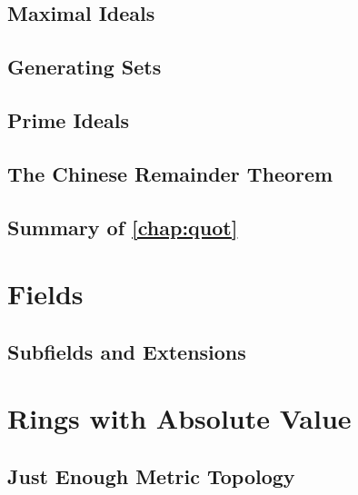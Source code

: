 \documentclass{memoir}
\begin{document}
    \section{Maximal Ideals}
      \label{sec:max-ideals}
      
      \newpage

    \section{Generating Sets}
      \label{sec:gen-sets}
      
      \newpage

    \section{Prime Ideals}
      \newpage

    \section{The Chinese Remainder Theorem}
      \newpage

    \section*{Summary of \autoref{chap:quot}}
      

  \chapter{Fields}

    \section{Subfields and Extensions}


\setcounter{dummycounter}{\value{section}}%
\appendix
\setcounter{section}{\value{dummycounter}}%

  \chapter{Rings with Absolute Value}
    \label{chap:abs-val}
    
    \newpage

    \section{Just Enough Metric Topology}
      \label{sec:ring-with-abs-val}
      
      \newpage
\end{document}
